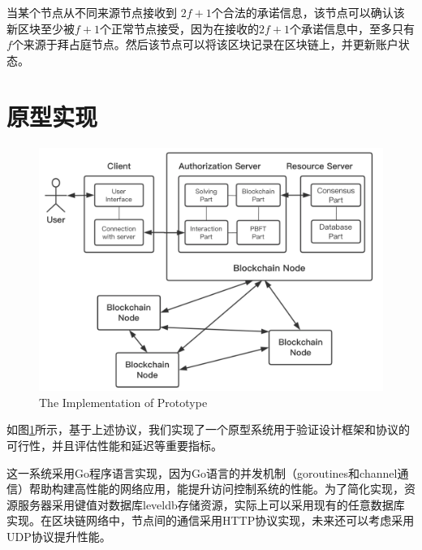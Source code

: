 当某个节点从不同来源节点接收到 $2f+1$个合法的承诺信息，该节点可以确认该新区块至少被$f+1$个正常节点接受，因为在接收的$2f+1$个承诺信息中，至多只有$f$个来源于拜占庭节点。然后该节点可以将该区块记录在区块链上，并更新账户状态。

\section{原型实现}

\begin{figure}
\centering
\includegraphics[width=12cm, keepaspectratio]{figures/implementation.png}
\caption{The Implementation of Prototype}
\label{fig:implementation}
\end{figure}

如图\ref{fig:implementation}所示，基于上述协议，我们实现了一个原型系统用于验证设计框架和协议的可行性，并且评估性能和延迟等重要指标。

这一系统采用Go程序语言实现，因为Go语言的并发机制（goroutines和channel通信）帮助构建高性能的网络应用，能提升访问控制系统的性能。为了简化实现，资源服务器采用键值对数据库leveldb存储资源，实际上可以采用现有的任意数据库实现。在区块链网络中，节点间的通信采用HTTP协议实现，未来还可以考虑采用UDP协议提升性能。

